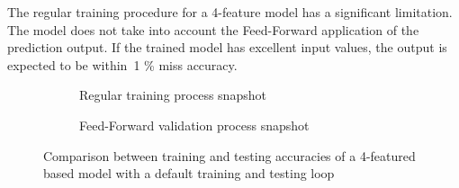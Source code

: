 The regular training procedure for a 4-feature model has a significant limitation. The model does not take into account the Feed-Forward application of the prediction output.
If the trained model has excellent input values, the output is expected to be within~1 \% miss accuracy.
\begin{figure}[htbp]
    \centering
    \begin{subfigure}[b]{0.45\textwidth}
        \centering
        
        \caption{Regular training process snapshot}
        \label{subfig:regular_tr}
    \end{subfigure}
    \hfill
    \begin{subfigure}[b]{0.45\textwidth}
        \centering
        
        \caption{Feed-Forward validation process snapshot}
        \label{subfig:regular_ts}
    \end{subfigure}
    \caption{Comparison between training and testing accuracies of a 4-featured based model with a default training and testing loop}
    \label{fig:regular_tr}
\end{figure}


